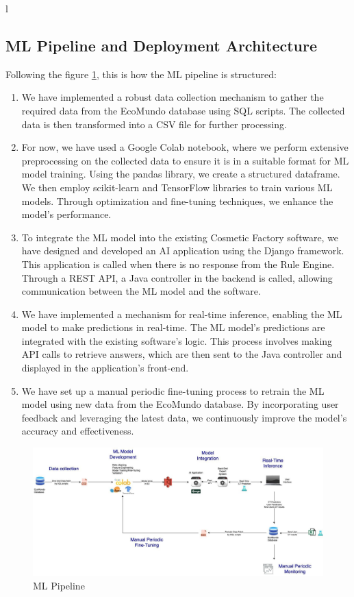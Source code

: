 l\documentclass[a4paper,12pt,twoside]{report}
\begin{document}
\subsection{ML Pipeline and Deployment Architecture}

Following the figure \ref{ML Pipeline}, this is how the ML pipeline is structured:
\begin{enumerate}
\item We have implemented a robust data collection mechanism to gather the required data from the EcoMundo database using SQL scripts. The collected data is then transformed into a CSV file for further processing.
\item For now, we have used a Google Colab notebook, where we perform extensive preprocessing on the collected data to ensure it is in a suitable format for ML model training. Using the pandas library, we create a structured dataframe. We then employ scikit-learn and TensorFlow libraries to train various ML models. Through optimization and fine-tuning techniques, we enhance the model's performance.
\item To integrate the ML model into the existing Cosmetic Factory software, we have designed and developed an AI application using the Django framework. This application is called when there is no response from the Rule Engine. Through a REST API, a Java controller in the backend is called, allowing communication between the ML model and the software.
\item We have implemented a mechanism for real-time inference, enabling the ML model to make predictions in real-time. The ML model's predictions are integrated with the existing software's logic. This process involves making API calls to retrieve answers, which are then sent to the Java controller and displayed in the application's front-end.
\item We have set up a manual periodic fine-tuning process to retrain the ML model using new data from the EcoMundo database. By incorporating user feedback and leveraging the latest data, we continuously improve the model's accuracy and effectiveness.

\end{enumerate}
\begin{figure}[H]
		\includegraphics[width=\textwidth]{images/ctDeploy}
	\caption[ML Pipeline]{ML Pipeline}
\label{ML Pipeline}
\end{figure}
\end{document}
